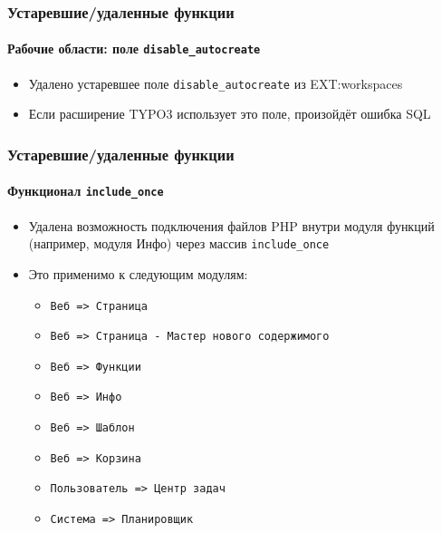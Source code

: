 \begin{frame}[fragile]
	\frametitle{Устаревшие/удаленные функции}
	\framesubtitle{Рабочие области: поле \texttt{disable\_autocreate}}

	\begin{itemize}
		\item Удалено устаревшее поле \texttt{disable\_autocreate} из EXT:workspaces
		\item Если расширение TYPO3 использует это поле, произойдёт ошибка SQL
	\end{itemize}

\end{frame}


\begin{frame}[fragile]
	\frametitle{Устаревшие/удаленные функции}
	\framesubtitle{Функционал \texttt{include\_once}}

	\begin{itemize}

		\item Удалена возможность подключения файлов PHP внутри модуля функций (например, модуля Инфо)
			через массив \texttt{include\_once}

		\item Это применимо к следующим модулям:

			\begin{itemize}
				\item \texttt{Веб => Страница}
				\item \texttt{Веб => Страница - Мастер нового содержимого}
				\item \texttt{Веб => Функции}
				\item \texttt{Веб => Инфо}
				\item \texttt{Веб => Шаблон}
				\item \texttt{Веб => Корзина}
				\item \texttt{Пользователь => Центр задач}
				\item \texttt{Система => Планировщик}
			\end{itemize}

	\end{itemize}

\end{frame}

